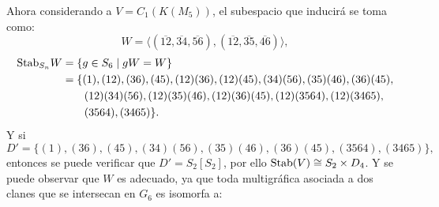 \documentclass[12pt]{book}
\theoremstyle{definition}
\newcounter{in}
\begin{document}
Ahora considerando a $V = C_{1}(K(M_5))$, el subespacio que inducirá se toma como:
$$W = \langle(\overline{12},\overline{34},\overline{56}),(\overline{12},\overline{35},\overline{46})\rangle,$$
  \begin{equation*}
    \begin{aligned}
      \textup{Stab}_{S_{n}} W &=\{g\in S_{6}\mid gW=W\}\\
      &=\{(1),(12),(36),(45),(12)(36),(12)(45),(34)(56),(35)(46),(36)(45),\\
      &\qquad{}(12)(34)(56),(12)(35)(46),(12)(36)(45),(12)(3564),(12)(3465), \\
      &\qquad{}(3564),(3465)\}.
    \end{aligned}
\end{equation*}
Y si
\begin{equation*}
      D' =\{(1),(36),(45),(34)(56),(35)(46),(36)(45),(3564),(3465)\},
\end{equation*}
entonces se puede verificar que $D' = S_{2} \left [ S_{2} \right ]$, por ello $\textup{Stab}(V) \cong S_{2} \times D_{4}$.
Y se puede observar que $W$ es adecuado, ya que toda multigráfica asociada a dos clanes que se intersecan en $G_{6}$ es isomorfa a:
\begin{center}
\end{center}
\end{document}
